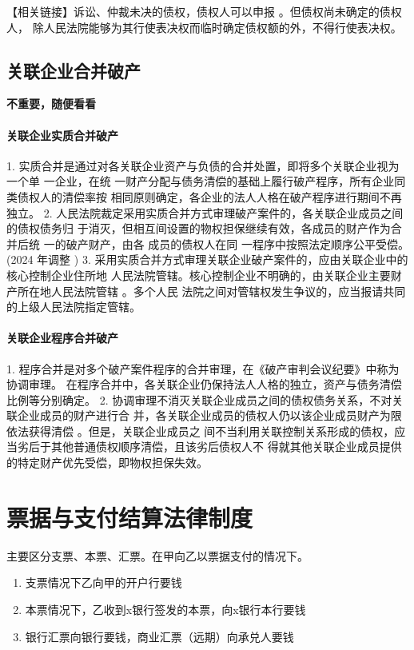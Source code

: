\documentclass[UTF8,12pt]{ctexart}
\numberwithin{equation}{section} %
\numberwithin{figure}{section}
\numberwithin{table}{section}
\begin{document}
	【相关链接】诉讼、仲裁未决的债权，债权人可以申报 。但债权尚未确定的债权人， 除人民法院能够为其行使表决权而临时确定债权额的外，不得行使表决权。
	
	\subsection{关联企业合并破产}
	\textbf{不重要，随便看看}
	
	\paragraph{关联企业实质合并破产}
	1. 实质合并是通过对各关联企业资产与负债的合并处置，即将多个关联企业视为一个单 一企业，在统 一财产分配与债务清偿的基础上履行破产程序，所有企业同类债权人的清偿率按 相同原则确定，各企业的法人人格在破产程序进行期间不再独立。
	2. 人民法院裁定采用实质合并方式审理破产案件的，各关联企业成员之间的债权债务归 于消灭，但相互间设置的物权担保继续有效，各成员的财产作为合并后统 一的破产财产，由各 成员的债权人在同 一程序中按照法定顺序公平受偿。(2024 年调整 )
	3. 采用实质合并方式审理关联企业破产案件的，应由关联企业中的核心控制企业住所地 人民法院管辖。核心控制企业不明确的，由关联企业主要财产所在地人民法院管辖 。多个人民 法院之间对管辖权发生争议的，应当报请共同的上级人民法院指定管辖。
	
	\paragraph{关联企业程序合并破产}
	1. 程序合并是对多个破产案件程序的合并审理，在《破产审判会议纪要》中称为协调审理。 在程序合并中，各关联企业仍保持法人人格的独立，资产与债务清偿比例等分别确定。
	2. 协调审理不消灭关联企业成员之间的债权债务关系，不对关联企业成员的财产进行合 并，各关联企业成员的债权人仍以该企业成员财产为限依法获得清偿 。但是，关联企业成员之 间不当利用关联控制关系形成的债权，应当劣后于其他普通债权顺序清偿，且该劣后债权人不 得就其他关联企业成员提供的特定财产优先受偿，即物权担保失效。
	


	
	\newpage
	\section{票据与支付结算法律制度}
	主要区分支票、本票、汇票。在甲向乙以票据支付的情况下。
	\begin{enumerate}
		\item 支票情况下乙向甲的开户行要钱
		
		\item 本票情况下，乙收到x银行签发的本票，向x银行本行要钱
		
		\item 银行汇票向银行要钱，商业汇票（远期）向承兑人要钱
	\end{enumerate}
		
\end{document}
